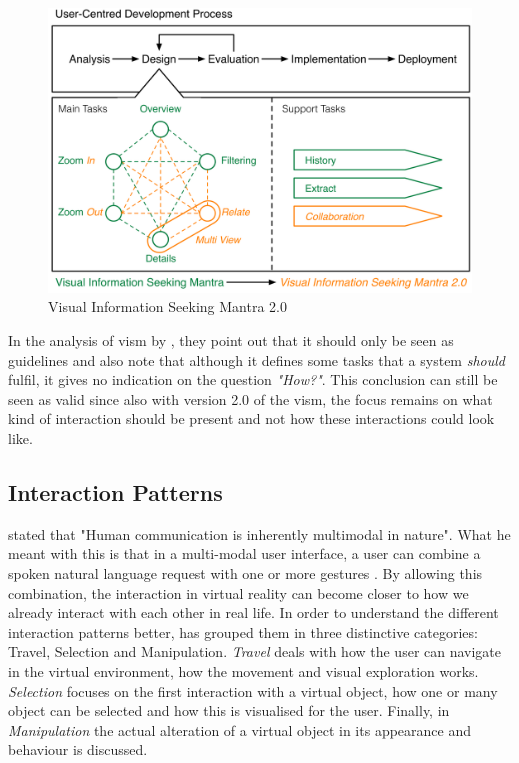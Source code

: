 \begin{figure}[h!]
	\begin{center}
		\includegraphics[width=12cm]{03_Figures/05_LitReview/Stauffer2016_VISM2.png}
		\caption[Visual Information Seeking Mantra 2.0]{Visual Information Seeking Mantra 2.0 \citep{Stauffer2016}}
		\label{fig:vism2}
	\end{center}
\end{figure}

In the analysis of \gls{vism} by \cite{Craft2005}, they point out that it should only be seen as guidelines and also note that although it defines some tasks that a system \textit{should} fulfil, it gives no indication on the question \textit{"How?"}. This conclusion can still be seen as valid since also with version 2.0 of the \gls{vism}, the focus remains on what kind of interaction should be present and not how these interactions could look like.



\subsection{Interaction Patterns}

\cite{Bunt1998} stated that "Human communication is inherently multimodal in nature". What he meant with this is that in a multi-modal user interface, a user can combine a spoken natural language request with one or more gestures \citep{Rosson2002}. By allowing this combination, the interaction in virtual reality can become closer to how we already interact with each other in real life. \newline
In order to understand the different interaction patterns better, \cite{Bowman2002} has grouped them in three distinctive categories: Travel, Selection and Manipulation. \textit{Travel} deals with how the user can navigate in the virtual environment, how the movement and visual exploration works. \textit{Selection} focuses on the first interaction with a virtual object, how one or many object can be selected and how this is visualised for the user. Finally, in \textit{Manipulation} the actual alteration of a virtual object in its appearance and behaviour is discussed.


